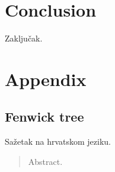 \documentclass[times, utf8, diplomski]{fer}
\begin{document}
\chapter{Conclusion}
Zaključak.

\chapter{Appendix}
\section{Fenwick tree}




\begin{sazetak}
Sažetak na hrvatskom jeziku.

\end{sazetak}

\begin{abstract}
Abstract.

\end{abstract}
\end{document}
